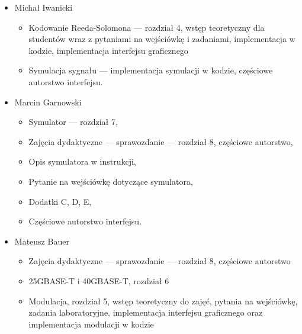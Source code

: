 \begin{itemize}
    \item Michał Iwanicki
    \begin{itemize}
        \item Kodowanie Reeda-Solomona --- rozdział 4, wstęp teoretyczny dla studentów
        wraz z pytaniami na wejściówkę i zadaniami, implementacja w kodzie,
        implementacja interfejsu graficznego
        \item Symulacja sygnału --- implementacja symulacji w kodzie, częściowe
        autorstwo interfejsu.
    \end{itemize}
    \item Marcin Garnowski
    \begin{itemize}
        \item Symulator --- rozdział 7,
        \item Zajęcia dydaktyczne --- sprawozdanie --- rozdział 8, częściowe autorstwo,
        \item Opis symulatora w instrukcji,
        \item Pytanie na wejściówkę dotyczące symulatora,
        \item Dodatki C, D, E,
        \item Częściowe autorstwo interfejsu. \\
    \end{itemize}
    \item Mateusz Bauer
    \begin{itemize}
        \item Zajęcia dydaktyczne --- sprawozdanie --- rozdział 8, częściowe autorstwo
        \item 25GBASE-T i 40GBASE-T, rozdział 6
        \item Modulacja, rozdział 5, wstęp teoretyczny do zajęć, pytania na wejściówkę,
        zadania laboratoryjne, implementacja interfejsu graficznego oraz implementacja
        modulacji w kodzie
    \end{itemize}
\end{itemize}
